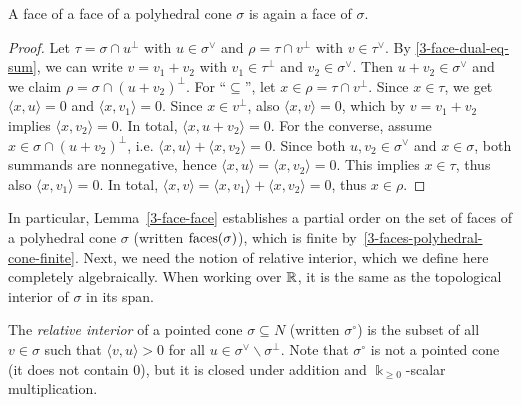 \begin{lemma}
  \label{3-face-face}
  A face of a face of a polyhedral cone \( \sigma \) is again a face
  of \( \sigma \).
\end{lemma}
\begin{proof}
  Let \( \tau = \sigma \cap u^{\perp} \) with \( u \in \sigma^{\vee}
  \) and \( \rho = \tau \cap v^{\perp} \) with \( v \in \tau^{\vee}
  \). By \ref{3-face-dual-eq-sum}, we can write \( v = v_1 + v_2 \)
  with \( v_1 \in \tau^{\perp} \) and \( v_2 \in \sigma^{\vee} \).
  Then \( u + v_2 \in \sigma^{\vee} \) and we claim \( \rho = \sigma
  \cap (u + v_2)^{\perp} \). For ``\( \subseteq \)'', let \( x \in
  \rho = \tau \cap v^{\perp} \). Since \( x \in \tau \), we get \(
  \langle x, u \rangle = 0 \) and \( \langle x, v_1 \rangle = 0 \).
  Since \( x \in v^{\perp} \), also \( \langle x, v \rangle = 0 \),
  which by \( v = v_1 + v_2 \) implies \( \langle x, v_2 \rangle = 0
  \). In total, \( \langle x, u + v_2 \rangle = 0 \). For the
  converse, assume \( x \in \sigma \cap (u + v_2)^{\perp} \), i.e. \(
  \langle x, u \rangle + \langle x, v_2 \rangle = 0 \). Since both \(
  u, v_2 \in \sigma^{\vee} \) and \( x \in \sigma \), both summands
  are nonnegative, hence \( \langle x, u \rangle = \langle x, v_2
  \rangle = 0 \). This implies \( x \in \tau \), thus also \( \langle
  x, v_1 \rangle = 0 \). In total, \( \langle x, v \rangle = \langle
  x, v_1 \rangle + \langle x, v_2 \rangle = 0 \), thus \( x \in \rho
  \).
\end{proof}

In particular, Lemma~\ref{3-face-face} establishes a partial order on
the set of faces of a polyhedral cone \( \sigma \) (written \(
\operatorname{faces}(\sigma) \)), which is finite
by~\ref{3-faces-polyhedral-cone-finite}. Next, we need the notion of
relative interior, which we define here completely algebraically. When
working over \( {\mathbb R} \), it is the same as the topological interior of
\( \sigma \) in its span.

\begin{definition}
  \label{3-rel-interior}
  The \emph{relative interior} of a pointed cone \( \sigma \subseteq N
  \) (written \( \sigma^{\circ} \)) is the subset of all \( v \in
  \sigma \) such that \( \langle v, u \rangle > 0 \) for all \( u \in
  \sigma^{\vee} \backslash \sigma^{\perp} \). Note that \(
  \sigma^{\circ} \) is not a pointed cone (it does not contain \( 0
  \)), but it is closed under addition and \( \Bbbk_{\geq 0} \)-scalar
  multiplication.
\end{definition}

